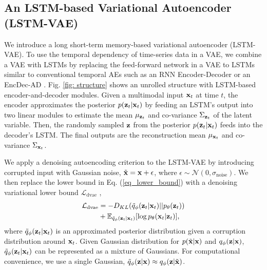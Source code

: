 \documentclass[letterpaper, 10 pt, conference]{ieeeconf}
\newcommand{\vz}{{\bf z}}
\newcommand{\vx}{{\bf x}}
\begin{document}
\subsection{An LSTM-based Variational Autoencoder (LSTM-VAE)} \label{ss_lstm_vae}
We introduce a long short-term memory-based variational autoencoder (LSTM-VAE). To use the temporal dependency of time-series data in a VAE, we combine a VAE with LSTMs by replacing the feed-forward network in a VAE to LSTMs similar to conventional temporal AEs such as an RNN Encoder-Decoder \cite{cho2014learning} or an EncDec-AD \cite{malhotra2016lstm}. Fig. \ref{fig: structure} shows an unrolled structure with LSTM-based encoder-and-decoder modules. Given a multimodal input $\vx_t$ at time $t$, the encoder approximates the posterior $p(\vz_{t}|\vx_{t})$ by feeding an LSTM's output into two linear modules to estimate the mean $\mu_{\vz_{t}}$ and co-variance $\Sigma_{\vz_{t}}$ of the latent variable. Then, the randomly sampled $\vz$ from the posterior $p(\vz_{t}|\vx_{t})$ feeds into the decoder's LSTM. The final outputs are the reconstruction mean $\mu_{\vx_{t}}$ and co-variance $\Sigma_{\vx_{t}}$. 

We apply a denoising autoencoding criterion \cite{vincent2008extracting} to the LSTM-VAE by introducing corrupted input with Gaussian noise, $\tilde{\vx} = \vx + \epsilon$, where $\epsilon \sim \mathcal{N}(0, \sigma_{\mathrm{noise}})$. We then replace the lower bound in Eq. (\ref{eq_lower_bound}) with a denoising variational lower bound $\mathcal{L_{\mathrm{dvae}}}$ \cite{im2017denoising}, 
\begin{align}
\mathcal{L_{\mathrm{dvae}}} &= -D_{KL}(\tilde{q}_{\phi}(\vz_{t}|\vx_{t})||p_{\theta}(\vz_{t})) \nonumber \\
&+\mathbb{E}_{\tilde{q}_{\phi}(\vz_t|\vx_t)}[\log p_{\theta}(\vx_t|\vz_t)],
\label{eq_denoising_lower_bound}
\end{align}where $\tilde{q}_{\phi}(\vz_t | \vx_t )$ is an approximated posterior distribution given a corruption distribution around $\vx_t$. Given Gaussian distribution for $p(\tilde{\vx}|\vx)$ and $q_{\phi}(\vz|\vx)$, $\tilde{q}_{\phi}(\vz_t | \vx_t )$ can be represented as a mixture of Gaussians. For computational convenience, we use a single Gaussian, $\tilde{q}_{\phi}(\vz|\vx) \approx q_{\phi}(\vz|\tilde{\vx})$.
\end{document}
